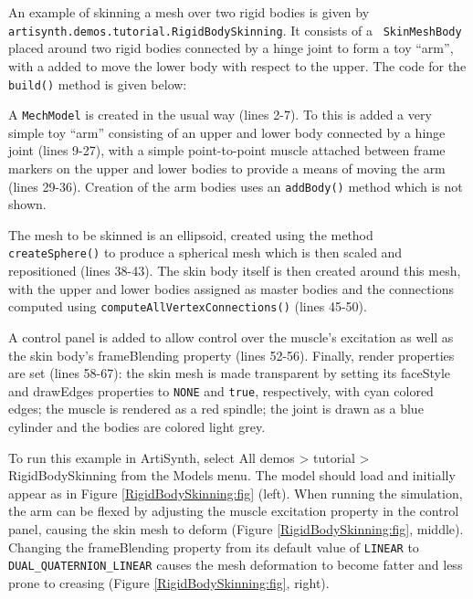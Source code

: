 An example of skinning a mesh over two rigid bodies is given by {\tt
artisynth.demos.tutorial.RigidBodySkinning}.  It consists of a {\tt
SkinMeshBody} placed around two rigid bodies connected by a hinge
joint to form a toy ``arm'', with a
 added to move the lower
body with respect to the upper.  
The code for the {\tt build()} method is given below:
\lstset{numbers=left}
\iflatexml
  
\else
  
\fi
\lstset{numbers=none}

A {\tt MechModel} is created in the usual way (lines 2-7).  To this is
added a very simple toy ``arm'' consisting of an upper and lower body
connected by a hinge joint (lines 9-27), with a simple
point-to-point muscle attached between frame markers on the upper and
lower bodies to provide a means of moving the arm (lines 29-36).
Creation of the arm bodies uses an {\tt addBody()} method which is not
shown.

The mesh to be skinned is an ellipsoid, created using the
 method {\tt createSphere()}
to produce a spherical mesh which is then scaled and repositioned
(lines 38-43). The skin body itself is then created around this mesh,
with the upper and lower bodies assigned as master bodies and the
connections computed using {\tt computeAllVertexConnections()} (lines
45-50).

A control panel is added to allow control over the muscle's {\sf
excitation} as well as the skin body's {\sf frameBlending} property
(lines 52-56). Finally, render properties are set (lines 58-67): the
skin mesh is made transparent by setting its {\sf faceStyle} and
{\sf drawEdges} properties to {\tt NONE} and {\tt true}, respectively,
with cyan colored edges; the muscle is rendered as a red spindle; the
joint is drawn as a blue cylinder and the bodies are colored light
grey.

To run this example in ArtiSynth, select {\sf All demos > tutorial >
RigidBodySkinning} from the {\sf Models} menu. The model should load
and initially appear as in Figure \ref{RigidBodySkinning:fig}
(left). When running the simulation, the arm can be flexed by
adjusting the muscle {\sf excitation} property in the control panel,
causing the skin mesh to deform (Figure
\ref{RigidBodySkinning:fig}, middle). Changing the
{\sf frameBlending} property from its default value of {\tt LINEAR} to
{\tt DUAL\_QUATERNION\_LINEAR} causes the mesh deformation to become
fatter and less prone to creasing (Figure
\ref{RigidBodySkinning:fig}, right).


